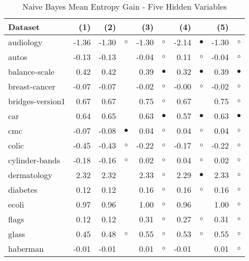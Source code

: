 \newpage
{\centering \footnotesize \begin{longtable}{lrr@{\hspace{0.1cm}}cr@{\hspace{0.1cm}}cr@{\hspace{0.1cm}}cr@{\hspace{0.1cm}}c}
\caption{\label{nbmeg5}Naive Bayes Mean Entropy Gain - Five Hidden Variables}
\\
\hline
Dataset & (1)& (2) & & (3) & & (4) & & (5) & \\
\hline
audiology & -1.36 & -1.30 &   $\circ$ & -1.30 &   $\circ$ & -2.14 &  $\bullet$ & -1.30 &   $\circ$\\
autos & -0.13 & -0.13 &           & -0.04 &   $\circ$ &  0.11 &    $\circ$ & -0.04 &   $\circ$\\
balance-scale &  0.42 &  0.42 &           &  0.39 & $\bullet$ &  0.32 &  $\bullet$ &  0.39 & $\bullet$\\
breast-cancer & -0.07 & -0.07 &           & -0.02 &   $\circ$ & -0.00 &    $\circ$ & -0.02 &   $\circ$\\
bridges-version1 &  0.67 &  0.67 &           &  0.75 &   $\circ$ &  0.67 &            &  0.75 &   $\circ$\\
car &  0.64 &  0.65 &           &  0.63 & $\bullet$ &  0.57 &  $\bullet$ &  0.63 & $\bullet$\\
cmc & -0.07 & -0.08 & $\bullet$ &  0.04 &   $\circ$ &  0.04 &    $\circ$ &  0.04 &   $\circ$\\
colic & -0.45 & -0.43 &   $\circ$ & -0.22 &   $\circ$ & -0.17 &    $\circ$ & -0.22 &   $\circ$\\
cylinder-bands & -0.18 & -0.16 &   $\circ$ &  0.02 &   $\circ$ &  0.04 &    $\circ$ &  0.02 &   $\circ$\\
dermatology &  2.32 &  2.32 &           &  2.33 &   $\circ$ &  2.29 &  $\bullet$ &  2.33 &   $\circ$\\
diabetes &  0.12 &  0.12 &           &  0.16 &   $\circ$ &  0.16 &    $\circ$ &  0.16 &   $\circ$\\
ecoli &  0.97 &  0.96 &           &  1.00 &   $\circ$ &  0.96 &            &  1.00 &   $\circ$\\
flags &  0.12 &  0.12 &           &  0.31 &   $\circ$ &  0.27 &    $\circ$ &  0.31 &   $\circ$\\
glass &  0.45 &  0.48 &   $\circ$ &  0.55 &   $\circ$ &  0.53 &    $\circ$ &  0.55 &   $\circ$\\
haberman & -0.01 & -0.01 &           &  0.01 &   $\circ$ & -0.01 &            &  0.01 &   $\circ$\\

\end{longtable}}
